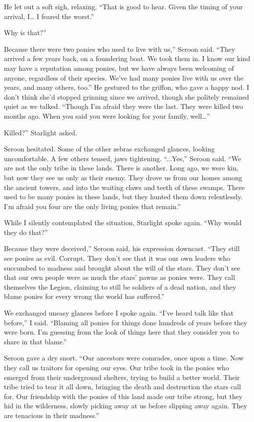 He let out a soft sigh, relaxing. “That is good to hear. Given the timing of your arrival, I… I feared the worst.”

\leavevmode{}Why is that?”

\leavevmode{}Because there were two ponies who used to live with us,” Seroon said. “They arrived a few years back, on a foundering boat. We took them in. I know our kind may have a reputation among ponies, but we have always been welcoming of anyone, regardless of their species. We’ve had many ponies live with us over the years, and many others, too.” He gestured to the griffon, who gave a happy nod. I don’t think she’d stopped grinning since we arrived, though she politely remained quiet as we talked. “Though I’m afraid they were the last. They were killed two months ago. When you said you were looking for your family, well…”

\leavevmode{}Killed?” Starlight asked.

Seroon hesitated. Some of the other zebras exchanged glances, looking uncomfortable. A few others tensed, jaws tightening. “...Yes,” Seroon said. “We are not the only tribe in these lands. There is another. Long ago, we were kin, but now they see us only as their enemy. They drove us from our homes among the ancient towers, and into the waiting claws and teeth of these swamps. There used to be many ponies in these lands, but they hunted them down relentlessly. I’m afraid you four are the only living ponies that remain.”

While I silently contemplated the situation, Starlight spoke again. “Why would they do that?”

\leavevmode{}Because they were deceived,” Seroon said, his expression downcast. “They still see ponies as evil. Corrupt. They don’t see that it was our own leaders who succumbed to madness and brought about the will of the stars. They don’t see that our own people were as much the stars’ pawns as ponies were. They call themselves the Legion, claiming to still be soldiers of a dead nation, and they blame ponies for every wrong the world has suffered.”

We exchanged uneasy glances before I spoke again. “I’ve heard talk like that before,” I said. “Blaming all ponies for things done hundreds of years before they were born. I’m guessing from the look of things here that they consider you to share in that blame.”

Seroon gave a dry snort. “Our ancestors were comrades, once upon a time. Now they call us traitors for opening our eyes. Our tribe took in the ponies who emerged from their underground shelters, trying to build a better world. Their tribe tried to tear it all down, bringing the death and destruction the stars call for. Our friendship with the ponies of this land made our tribe strong, but they hid in the wilderness, slowly picking away at us before slipping away again. They are tenacious in their madness.”

